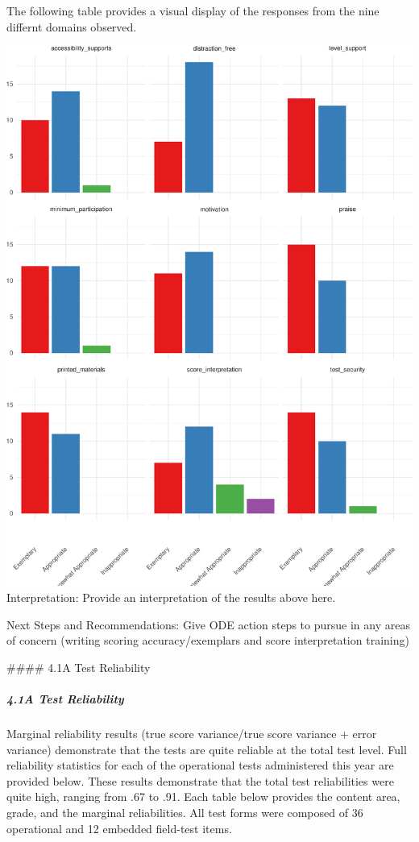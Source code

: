 \documentclass[]{article}
\let\oldsubparagraph\subparagraph
\renewcommand{\subparagraph}[1]{\oldsubparagraph{#1}\mbox{}}
\begin{document}
\clearpage
\FloatBarrier
The following table provides a visual display of the responses from the
nine differnt domains observed.

\includegraphics{tech_report_18_files/figure-latex/unnamed-chunk-2-1.pdf}
Interpretation: Provide an interpretation of the results above here.

Next Steps and Recommendations: Give ODE action steps to pursue in any
areas of concern (writing scoring accuracy/exemplars and score
interpretation training)

\clearpage
\#\#\#\# 4.1A Test Reliability

\subparagraph{4.1A Test Reliability}\label{a-test-reliability}

Marginal reliability results (true score variance/true score variance +
error variance) demonstrate that the tests are quite reliable at the
total test level. Full reliability statistics for each of the
operational tests administered this year are provided below. These
results demonstrate that the total test reliabilities were quite high,
ranging from .67 to .91. Each table below provides the content area,
grade, and the marginal reliabilities. All test forms were composed of
36 operational and 12 embedded field-test items.
\end{document}
